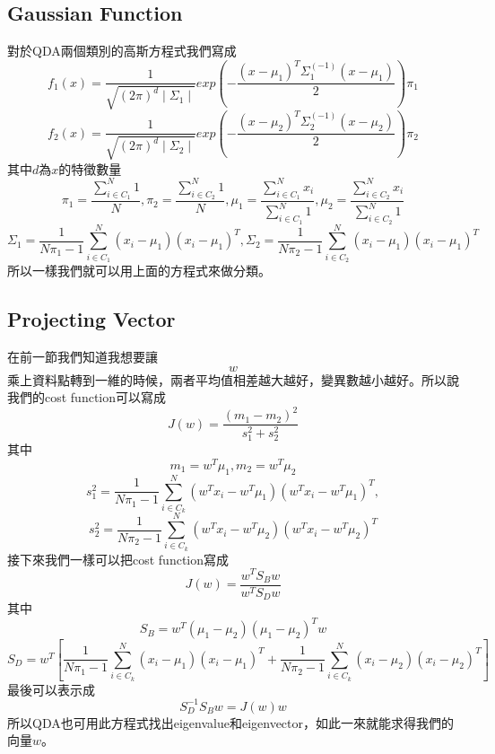 \subsection{Gaussian Function}
對於QDA兩個類別的高斯方程式我們寫成
$$f_1(x)=\frac{1}{\sqrt{(2\pi)^d\mid\Sigma_1\mid}}exp\left(-\frac{(x-\mu_1)^T\Sigma_1^{(-1)}(x-\mu_1)}{2}\right)\pi_1$$
$$f_2(x)=\frac{1}{\sqrt{(2\pi)^d\mid\Sigma_2\mid}}exp\left(-\frac{(x-\mu_2)^T\Sigma_2^{(-1)}(x-\mu_2)}{2}\right)\pi_2$$
其中$d$為$x$的特徵數量
$$\pi_1=\frac{\sum_{i\in C_1}^N1}{N},\pi_2=\frac{\sum_{i\in C_2}^N1}{N},\mu_1=\frac{\sum_{i\in C_1}^Nx_i}{\sum_{i\in C_1}^N1},\mu_2=\frac{\sum_{i\in C_2}^Nx_i}{\sum_{i\in C_2}^N1}$$
$$\Sigma_1=\frac{1}{N\pi_1-1}\sum_{i\in C_1}^N(x_i-\mu_1)(x_i-\mu_1)^T,\Sigma_2=\frac{1}{N\pi_2-1}\sum_{i\in C_2}^N(x_i-\mu_1)(x_i-\mu_1)^T$$
所以一樣我們就可以用上面的方程式來做分類。
\subsection{Projecting Vector}
在前一節我們知道我想要讓$$w$$乘上資料點轉到一維的時候，兩者平均值相差越大越好，變異數越小越好。所以說我們的cost function可以寫成
$$J(w)=\frac{(m_1-m_2)^2}{s_1^2+s_2^2}$$
其中
$$m_1=w^T\mu_1,m_2=w^T\mu_2$$
$$s_1^2=\frac{1}{N\pi_1-1}\sum_{i\in C_k}^N(w^Tx_i-w^T\mu_1)(w^Tx_i-w^T\mu_1)^T,$$
$$s_2^2=\frac{1}{N\pi_2-1}\sum_{i\in C_k}^N(w^Tx_i-w^T\mu_2)(w^Tx_i-w^T\mu_2)^T$$
接下來我們一樣可以把cost function寫成
$$J(w)=\frac{w^TS_Bw}{w^TS_Dw}$$
其中
$$S_B=w^T(\mu_1-\mu_2)(\mu_1-\mu_2)^Tw$$
$$S_D=w^T\left[\frac{1}{N\pi_1-1}\sum_{i\in C_k}^N(x_i-\mu_1)(x_i-\mu_1)^T+\frac{1}{N\pi_2-1}\sum_{i\in C_k}^N(x_i-\mu_2)(x_i-\mu_2)^T\right]$$
最後可以表示成
$$S_D^{-1}S_Bw=J(w)w$$
所以QDA也可用此方程式找出eigenvalue和eigenvector，如此一來就能求得我們的向量$w$。
